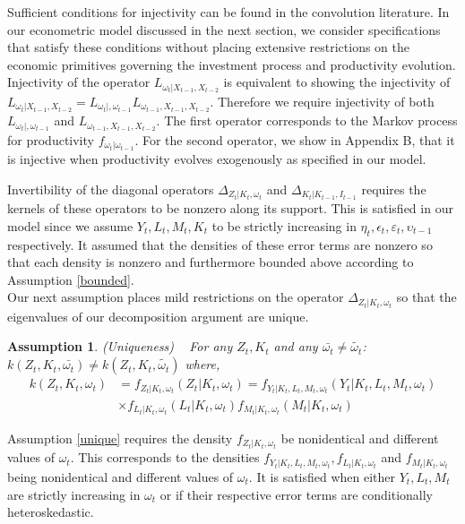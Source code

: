 \documentclass{article}
\newtheorem{assump}{Assumption}[section]
\begin{document}
Sufficient conditions for injectivity can be found in the convolution literature. In our econometric model discussed in the next section, we consider specifications that satisfy these conditions without placing extensive restrictions on the economic primitives governing the investment process and productivity evolution.\\

Injectivity of the operator $L_{\omega_{t}|X_{t-1}, X_{t-2}}$ is equivalent to showing the injectivity of $L_{\omega_{t}|X_{t-1}, X_{t-2}}=L_{\omega_{t}|, \omega_{t-1}}L_{\omega_{t-1}, X_{t-1}, X_{t-2}}$. Therefore we require injectivity of both $L_{\omega_{t}|, \omega_{t-1}}$ and $L_{\omega_{t-1}, X_{t-1}, X_{t-2}}$. The first operator corresponds to the Markov process for productivity $f_{\omega_{t}|\omega_{t-1}}$. For the second operator, we show in Appendix B, that it is injective when productivity evolves exogenously as specified in our model.

Invertibility of the diagonal operators $\Delta_{Z_{t}|K_{t}, \omega_{t}}$ and $\Delta_{K_{t}|K_{t-1}, I_{t-1}}$ requires the kernels of these operators to be nonzero along its support. This is satisfied in our model since we assume $Y_{t}, L_{t}, M_{t}, K_{t}$ to be strictly increasing in $\eta_{t}, \epsilon_{t}, \varepsilon_{t}, \upsilon_{t-1}$ respectively. It assumed that the densities of these error terms are nonzero so that each density is nonzero and furthermore bounded above according to Assumption \eqref{bounded}.\\ 

Our next assumption places mild restrictions on the operator $\Delta_{Z_{t}|K_{t}, \omega_{t}}$ so that the eigenvalues of our decomposition argument are unique.
\begin{assump} (Uniqueness) \label{unique}
~
For any $Z_{t}, K_{t}$ and any $\bar{\omega_{t}}\neq \tilde{\omega_{t}}$:
 $k(Z_{t}, K_{t}, \bar{\omega_{t}})\neq k(Z_{t}, K_{t}, \tilde{\omega_{t}})$ where,\\
        \begin{equation}
        \begin{split}
        k(Z_{t}, K_{t}, \omega_{t})&=f_{Z_{t}|K_{t}, \omega_{t}}(Z_{t}|K_{t}, \omega_{t})=f_{Y_{t}|K_{t}, L_{t}, M_{t}, \omega_{t}}(Y_{t}|K_{t}, L_{t}, M_{t}, \omega_{t})\\
        &\times f_{L_{t}|K_{t}, \omega_{t}}(L_{t}|K_{t}, \omega_{t})f_{M_{t}|K_{t}, \omega_{t}}(M_{t}|K_{t}, \omega_{t})
        \end{split}
        \end{equation}
\end{assump}
Assumption \eqref{unique} requires the density $f_{Z_{t}|K_{t}, \omega_{t}}$ be nonidentical and different values of $\omega_{t}$. This corresponds to the densities $f_{Y_{t}|K_{t}, L_{t}, M_{t}, \omega_{t}}, f_{L_{t}|K_{t}, \omega_{t}}$ and $f_{M_{t}|K_{t}, \omega_{t}}$ being nonidentical and different values of $\omega_{t}$. It is satisfied when either $Y_{t}, L_{t}, M_{t}$ are strictly increasing in $\omega_{t}$ or if their respective error terms are conditionally heteroskedastic.
\end{document}
